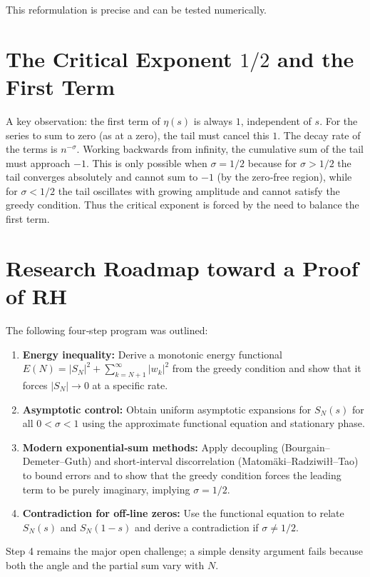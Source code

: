 \documentclass[12pt,a4paper]{article}
\begin{document}
This reformulation is precise and can be tested numerically.

\section{The Critical Exponent $1/2$ and the First Term}

A key observation: the first term of $\eta(s)$ is always $1$, independent of $s$. For the series to sum to zero (as at a zero), the tail must cancel this $1$. The decay rate of the terms is $n^{-\sigma}$. Working backwards from infinity, the cumulative sum of the tail must approach $-1$. This is only possible when $\sigma=1/2$ because for $\sigma>1/2$ the tail converges absolutely and cannot sum to $-1$ (by the zero‑free region), while for $\sigma<1/2$ the tail oscillates with growing amplitude and cannot satisfy the greedy condition. Thus the critical exponent is forced by the need to balance the first term.

\section{Research Roadmap toward a Proof of RH}

The following four‑step program was outlined:

\begin{enumerate}
    \item \textbf{Energy inequality:} Derive a monotonic energy functional $E(N)=|S_N|^2+\sum_{k=N+1}^\infty |w_k|^2$ from the greedy condition and show that it forces $|S_N|\to0$ at a specific rate.
    \item \textbf{Asymptotic control:} Obtain uniform asymptotic expansions for $S_N(s)$ for all $0<\sigma<1$ using the approximate functional equation and stationary phase.
    \item \textbf{Modern exponential‑sum methods:} Apply decoupling (Bourgain–Demeter–Guth) and short‑interval discorrelation (Matomäki–Radziwiłł–Tao) to bound errors and to show that the greedy condition forces the leading term to be purely imaginary, implying $\sigma=1/2$.
    \item \textbf{Contradiction for off‑line zeros:} Use the functional equation to relate $S_N(s)$ and $S_N(1-s)$ and derive a contradiction if $\sigma\neq1/2$.
\end{enumerate}

Step 4 remains the major open challenge; a simple density argument fails because both the angle and the partial sum vary with $N$.
\end{document}
